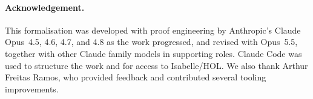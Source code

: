 \paragraph*{Acknowledgement.}
This formalisation was developed with proof engineering by
Anthropic's Claude Opus~4.5, 4.6, 4.7, and 4.8 as the work progressed,
and revised with Opus~5.5, together with other Claude family models in
supporting roles.
Claude Code was used to structure the work and for access to Isabelle/HOL.
We also thank Arthur Freitas Ramos, who provided feedback and
contributed several tooling improvements.
